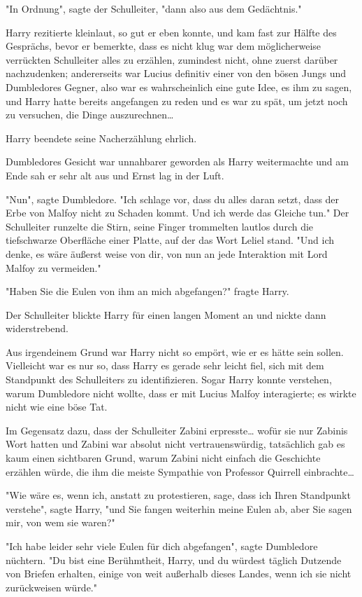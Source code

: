 {"In Ordnung", sagte der Schulleiter, "dann also aus dem Gedächtnis."

Harry rezitierte kleinlaut, so gut er eben konnte, und kam fast zur Hälfte des Gesprächs, bevor er bemerkte, dass es nicht klug war dem möglicherweise verrückten Schulleiter alles zu erzählen, zumindest nicht, ohne zuerst darüber nachzudenken; andererseits war Lucius definitiv einer von den bösen Jungs und Dumbledores Gegner, also war es wahrscheinlich eine gute Idee, es ihm zu sagen, und Harry hatte bereits angefangen zu reden und es war zu spät, um jetzt noch zu versuchen, die Dinge auszurechnen…

Harry beendete seine Nacherzählung ehrlich.

Dumbledores Gesicht war unnahbarer geworden als Harry weitermachte und am Ende sah er sehr alt aus und Ernst lag in der Luft.

"Nun", sagte Dumbledore. "Ich schlage vor, dass du alles daran setzt, dass der Erbe von Malfoy nicht zu Schaden kommt. Und ich werde das Gleiche tun." Der Schulleiter runzelte die Stirn, seine Finger trommelten lautlos durch die tiefschwarze Oberfläche einer Platte, auf der das Wort Leliel stand. "Und ich denke, es wäre äußerst weise von dir, von nun an jede Interaktion mit Lord Malfoy zu vermeiden."

"Haben Sie die Eulen von ihm an mich abgefangen?" fragte Harry.

Der Schulleiter blickte Harry für einen langen Moment an und nickte dann widerstrebend.

Aus irgendeinem Grund war Harry nicht so empört, wie er es hätte sein sollen. Vielleicht war es nur so, dass Harry es gerade sehr leicht fiel, sich mit dem Standpunkt des Schulleiters zu identifizieren. Sogar Harry konnte verstehen, warum Dumbledore nicht wollte, dass er mit Lucius Malfoy interagierte; es wirkte nicht wie eine böse Tat.

Im Gegensatz dazu, dass der Schulleiter Zabini erpresste… wofür sie nur Zabinis Wort hatten und Zabini war absolut nicht vertrauenswürdig, tatsächlich gab es kaum einen sichtbaren Grund, warum Zabini nicht einfach die Geschichte erzählen würde, die ihm die meiste Sympathie von Professor Quirrell einbrachte…

"Wie wäre es, wenn ich, anstatt zu protestieren, sage, dass ich Ihren Standpunkt verstehe", sagte Harry, "und Sie fangen weiterhin meine Eulen ab, aber Sie sagen mir, von wem sie waren?"

"Ich habe leider sehr viele Eulen für dich abgefangen", sagte Dumbledore nüchtern. "Du bist eine Berühmtheit, Harry, und du würdest täglich Dutzende von Briefen erhalten, einige von weit außerhalb dieses Landes, wenn ich sie nicht zurückweisen würde."

}
